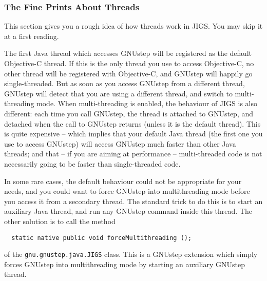 \subsubsection{The Fine Prints About Threads}

This section gives you a rough idea of how threads work in JIGS.  You
may skip it at a first reading.

The first Java thread which accesses GNUstep will be registered as the
default Objective-C thread.  If this is the only thread you use to
access Objective-C, no other thread will be registered with
Objective-C, and GNUstep will happily go single-threaded.  But as soon
as you access GNUstep from a different thread, GNUstep will detect
that you are using a different thread, and switch to multi-threading
mode.  When multi-threading is enabled, the behaviour of JIGS is also
different: each time you call GNUstep, the thread is attached to
GNUstep, and detached when the call to GNUstep returns (unless it is
the default thread).  This is quite expensive -- which implies that
your default Java thread (the first one you use to access GNUstep)
will access GNUstep much faster than other Java threads; and that -- if
you are aiming at performance -- multi-threaded code is not
necessarily going to be faster than single-threaded code.

In some rare cases, the default behaviour could not be appropriate for
your needs, and you could want to force GNUstep into multithreading
mode before you access it from a secondary thread.  The standard trick
to do this is to start an auxiliary Java thread, and run any GNUstep
command inside this thread.  The other solution is to call the method
\begin{verbatim}
  static native public void forceMultithreading ();
\end{verbatim}
of the \texttt{gnu.gnustep.java.JIGS} class.  This is a GNUstep
extension which simply forces GNUstep into multithreading mode by
starting an auxiliary GNUstep thread.
